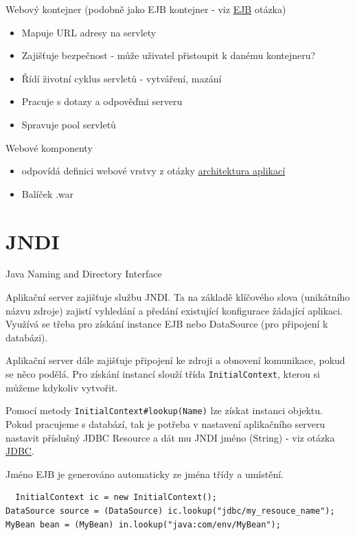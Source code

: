 \documentclass{szzclass}
\begin{document}
Webový kontejner (podobně jako EJB kontejner - viz \href{https://docs.google.com/document/d/1_yV6LyQ3dHi9VSOQhmPtGe9QXRESZDfxDK_NA9gJ1dY/edit?usp=sharing}{EJB} otázka)
\begin{itemize}
\item Mapuje URL adresy na servlety
\item Zajišťuje bezpečnost - může uživatel přistoupit k danému kontejneru?
\item Řídí životní cyklus servletů - vytváření, mazání
\item Pracuje s dotazy a odpověďmi serveru
\item Spravuje pool servletů
\end{itemize}

Webové komponenty
\begin{itemize}
\item odpovídá definici webové vrstvy z otázky \href{https://docs.google.com/document/d/1OU75LDsImR4cEsQoyfGNyibG5ECJhGRKCfJqrUlpl1Q/edit?usp=sharing}{architektura aplikací}
\item Balíček .war
\end{itemize}

\section{JNDI}
Java Naming and Directory Interface

Aplikační server zajišťuje službu JNDI. Ta na základě klíčového slova (unikátního názvu zdroje) zajistí vyhledání a předání existující konfigurace žádající aplikaci. Využívá se třeba pro získání instance EJB nebo DataSource (pro připojení k databázi).

Aplikační server dále zajišťuje připojení ke zdroji a obnovení komunikace, pokud se něco podělá. Pro získání instancí slouží třída \texttt{InitialContext}, kterou si můžeme kdykoliv vytvořit.

Pomocí metody \texttt{InitialContext#lookup(Name)} lze získat instanci objektu. Pokud pracujeme s databází, tak je potřeba v nastavení aplikačního serveru nastavit příslušný JDBC Resource a dát mu JNDI jméno (String) - viz otázka \href{https://docs.google.com/document/d/1Wfd-xg3CgY6YCLi15wh3ngDN0sPNNcg3bplWePlXTwM/edit}{JDBC}.

Jméno EJB je generováno automaticky ze jména třídy a umístění.

\begin{verbatim}
  InitialContext ic = new InitialContext();
DataSource source = (DataSource) ic.lookup("jdbc/my_resouce_name");
MyBean bean = (MyBean) in.lookup("java:com/env/MyBean");
\end{verbatim}
\end{document}
